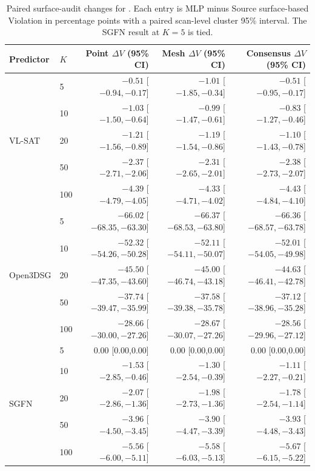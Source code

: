\begin{table}[t]
\centering
{\small
\setlength{\tabcolsep}{2.0pt}
\begin{tabular}{llrrr}
\toprule
Predictor & $K$ & Point $\Delta V$ (95\% CI) & Mesh $\Delta V$ (95\% CI) & Consensus $\Delta V$ (95\% CI) \\
\midrule
\multirow{5}{*}{VL-SAT}
 & 5   & $-0.51$ [$-0.94,-0.17$] & $-1.01$ [$-1.85,-0.34$] & $-0.51$ [$-0.95,-0.17$] \\
 & 10  & $-1.03$ [$-1.50,-0.64$] & $-0.99$ [$-1.47,-0.61$] & $-0.83$ [$-1.27,-0.46$] \\
 & 20  & $-1.21$ [$-1.56,-0.89$] & $-1.19$ [$-1.54,-0.86$] & $-1.10$ [$-1.43,-0.78$] \\
 & 50  & $-2.37$ [$-2.71,-2.06$] & $-2.31$ [$-2.65,-2.01$] & $-2.38$ [$-2.73,-2.07$] \\
 & 100 & $-4.39$ [$-4.79,-4.05$] & $-4.33$ [$-4.71,-4.02$] & $-4.43$ [$-4.84,-4.10$] \\
\midrule
\multirow{5}{*}{Open3DSG}
 & 5   & $-66.02$ [$-68.35,-63.30$] & $-66.37$ [$-68.53,-63.80$] & $-66.36$ [$-68.57,-63.78$] \\
 & 10  & $-52.32$ [$-54.26,-50.28$] & $-52.11$ [$-54.11,-50.07$] & $-52.01$ [$-54.05,-49.98$] \\
 & 20  & $-45.50$ [$-47.35,-43.60$] & $-45.00$ [$-46.74,-43.18$] & $-44.63$ [$-46.41,-42.78$] \\
 & 50  & $-37.74$ [$-39.47,-35.99$] & $-37.58$ [$-39.38,-35.78$] & $-37.12$ [$-38.96,-35.28$] \\
 & 100 & $-28.66$ [$-30.00,-27.26$] & $-28.67$ [$-30.07,-27.26$] & $-28.56$ [$-29.96,-27.12$] \\
\midrule
\multirow{5}{*}{SGFN}
 & 5   & 0.00 [0.00,0.00] & 0.00 [0.00,0.00] & 0.00 [0.00,0.00] \\
 & 10  & $-1.53$ [$-2.85,-0.46$] & $-1.30$ [$-2.54,-0.39$] & $-1.11$ [$-2.27,-0.21$] \\
 & 20  & $-2.07$ [$-2.86,-1.36$] & $-1.98$ [$-2.73,-1.36$] & $-1.78$ [$-2.54,-1.14$] \\
 & 50  & $-3.96$ [$-4.50,-3.45$] & $-3.90$ [$-4.47,-3.39$] & $-3.93$ [$-4.48,-3.43$] \\
 & 100 & $-5.56$ [$-6.00,-5.11$] & $-5.58$ [$-6.03,-5.13$] & $-5.67$ [$-6.15,-5.22$] \\
\bottomrule
\end{tabular}
}
\caption{Paired surface-audit changes for \methodmlp{}. Each entry is MLP
minus Source surface-based Violation in percentage points with a paired
scan-level cluster 95\% interval. The SGFN result at $K=5$ is tied.}
\label{tab:surface-audit-ci-mlp}
\end{table}

